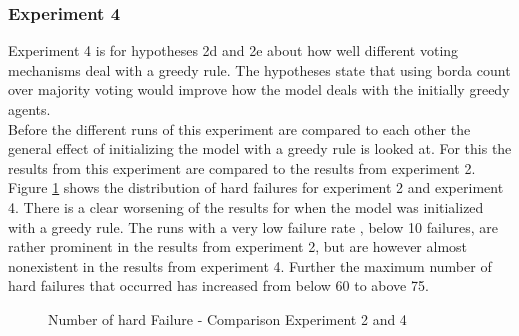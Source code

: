 \documentclass[a4paper]{article}
\begin{document}
\subsubsection{Experiment 4}
Experiment 4 is for hypotheses 2d and 2e about how well different voting mechanisms  deal with a greedy rule. The hypotheses state 
that using borda count over majority voting would improve how the model deals with the initially greedy agents. \\
Before the different runs of this experiment are compared to each other the general effect of initializing the 
model with a greedy rule is looked at. For this the results from this 
experiment are compared to the results from experiment 2. Figure \ref{d_comp} shows the distribution of hard failures 
for experiment 2 and experiment 4. There is a clear worsening of the results for when the model was initialized with a 
greedy rule. The runs with a very low failure rate , below 10 failures, are rather prominent in the results from 
experiment 2, but are however almost nonexistent in the results from experiment 4. Further the maximum number 
of hard failures that occurred has increased from below 60 to above 75. \\
\begin{figure}[!ht]
\caption{Number of hard Failure - Comparison Experiment 2 and 4}
\label{d_comp}
\end{figure}\\
\end{document}
